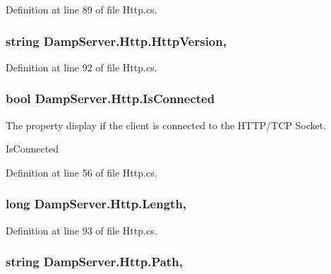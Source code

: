 Definition at line 89 of file Http.\-cs.

\hypertarget{class_damp_server_1_1_http_a596e999fb442757b904fdddb597029f7}{
\subsubsection[{Http\-Version}]{\setlength{\rightskip}{0pt plus 5cm}string Damp\-Server.\-Http.\-Http\-Version\hspace{0.3cm}{\ttfamily [get]}, {\ttfamily [set]}}}\label{class_damp_server_1_1_http_a596e999fb442757b904fdddb597029f7}


Definition at line 92 of file Http.\-cs.

\hypertarget{class_damp_server_1_1_http_a90728ed8b720d4a1e4988aab6966def0}{
\subsubsection[{Is\-Connected}]{\setlength{\rightskip}{0pt plus 5cm}bool Damp\-Server.\-Http.\-Is\-Connected\hspace{0.3cm}{\ttfamily [get]}}}\label{class_damp_server_1_1_http_a90728ed8b720d4a1e4988aab6966def0}


The property display if the client is connected to the H\-T\-T\-P/\-T\-C\-P Socket. 

Is\-Connected 

Definition at line 56 of file Http.\-cs.

\hypertarget{class_damp_server_1_1_http_a3a8f75a3664306404d8c8d174e987832}{
\subsubsection[{Length}]{\setlength{\rightskip}{0pt plus 5cm}long Damp\-Server.\-Http.\-Length\hspace{0.3cm}{\ttfamily [get]}, {\ttfamily [set]}}}\label{class_damp_server_1_1_http_a3a8f75a3664306404d8c8d174e987832}


Definition at line 93 of file Http.\-cs.

\hypertarget{class_damp_server_1_1_http_aae780a80b09ab272dd3f81a3c71f1424}{
\subsubsection[{Path}]{\setlength{\rightskip}{0pt plus 5cm}string Damp\-Server.\-Http.\-Path\hspace{0.3cm}{\ttfamily [get]}, {\ttfamily [set]}}}\label{class_damp_server_1_1_http_aae780a80b09ab272dd3f81a3c71f1424}


